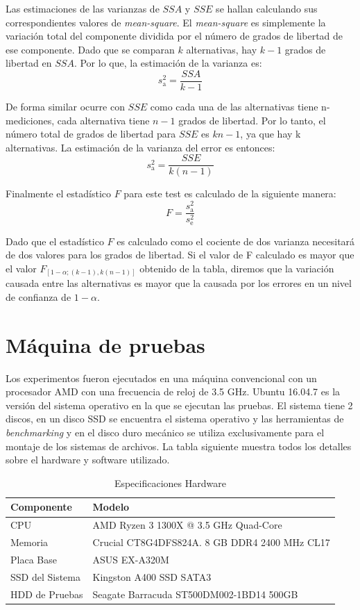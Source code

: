 Las estimaciones de las varianzas de $SSA$ y $SSE$ se hallan calculando sus correspondientes valores de \textit{mean-square}. El \textit{mean-square} es simplemente la variación total del componente dividida por el número de grados de libertad de ese componente. Dado que se comparan $k$ alternativas, hay $k-1$ grados de libertad en $SSA$. Por lo que, la estimación de la varianza es: $$
s_{\mathrm{a}}^{2}=\frac{S S A}{k-1}
$$

De forma similar ocurre con $SSE$ como cada una de las alternativas tiene n-mediciones, cada alternativa tiene $n-1$ grados de libertad. Por lo tanto, el número total de grados de libertad para $SSE$ es $kn-1$, ya que hay k alternativas. La estimación de la varianza del error es entonces: 
$$
s_{\mathrm{a}}^{2}=\frac{S S E}{k(n-1)}
$$

Finalmente el estadístico $F$ para este test es calculado de la siguiente manera: $$
F=\frac{s_{\mathrm{a}}^{2}}{s_{\mathrm{e}}^{2}}
$$

Dado que el estadístico $F$ es calculado como el cociente de dos varianza necesitará de dos valores para los grados de libertad. Si el valor de F calculado es mayor que el valor $F_{[1-\alpha ;(k-1), k(n-1)]}$ obtenido de la tabla, diremos que la variación causada entre las alternativas es mayor que la causada por los errores en un nivel de confianza de $1-\alpha$.



\section{Máquina de pruebas}
Los experimentos fueron ejecutados en una máquina convencional con un procesador AMD con una frecuencia de reloj de 3.5 GHz. Ubuntu 16.04.7 es la versión del sistema operativo en la que se ejecutan las pruebas. El sistema tiene 2 discos, en un disco SSD se encuentra el sistema operativo y las herramientas de \textit{benchmarking} y en el disco duro mecánico se utiliza exclusivamente para el montaje de los sistemas de archivos. La tabla siguiente muestra todos los detalles sobre el hardware y software utilizado.
\begin{table}[h]
    \centering
    \begin{tabular}{|l|l|}
    \hline
        Componente & Modelo \\ \hline\hline
        CPU & AMD Ryzen 3 1300X @ 3.5 GHz Quad-Core \\ \hline
        Memoria & Crucial CT8G4DFS824A. 8 GB DDR4 2400 MHz CL17 \\ \hline
        Placa Base & ASUS EX-A320M \\ \hline
        SSD del Sistema & Kingston A400 SSD SATA3 \\ \hline
        HDD de Pruebas & Seagate Barracuda ST500DM002-1BD14 500GB \\ \hline
    \end{tabular}
    \caption{Especificaciones Hardware}
\label{table:1}
\end{table}

